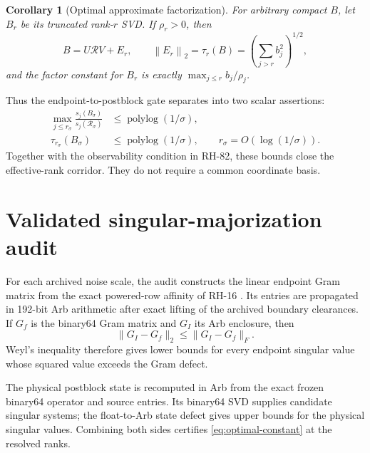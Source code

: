 \documentclass[11pt]{article}
\newtheorem{corollary}[theorem]{Corollary}
\theoremstyle{remark}
\newcommand{\norm}[1]{\left\lVert#1\right\rVert}
\newcommand{\cR}{\mathcal R}
\begin{document}
\begin{corollary}[Optimal approximate factorization]
\label{cor:approximate}
For arbitrary compact $B$, let $B_r$ be its truncated rank-$r$ SVD.  If
$\rho_r>0$, then
\begin{equation}
 B=U\cR V+E_r,
 \qquad
 \norm{E_r}_2=\tau_r(B)
 =\left(\sum_{j>r}b_j^2\right)^{1/2},
 \label{eq:approximate}
\end{equation}
and the factor constant for $B_r$ is exactly
$\max_{j\le r}b_j/\rho_j$.
\end{corollary}

Thus the endpoint-to-postblock gate separates into two scalar assertions:
\begin{align}
 \max_{j\le r_\sigma}\frac{s_j(B_\sigma)}
 {s_j(\cR_\sigma)}&\le\operatorname{polylog}(1/\sigma),
 \label{eq:majorization}\\
 \tau_{r_\sigma}(B_\sigma)&\le\operatorname{polylog}(1/\sigma),
 \qquad r_\sigma=O(\log(1/\sigma)).
 \label{eq:remainder}
\end{align}
Together with the observability condition in RH-82, these bounds close the
effective-rank corridor.  They do not require a common coordinate basis.

\section{Validated singular-majorization audit}

For each archived noise scale, the audit constructs the linear endpoint Gram
matrix from the exact powered-row affinity of RH-16
\citep{WangEndpointRank2026}.  Its entries are propagated in 192-bit Arb
arithmetic after exact lifting of the archived boundary clearances.  If
$G_f$ is the binary64 Gram matrix and $G_I$ its Arb enclosure, then
\[
 \|G_I-G_f\|_2\le\|G_I-G_f\|_F.
\]
Weyl's inequality therefore gives lower bounds for every endpoint singular
value whose squared value exceeds the Gram defect.

The physical postblock state is recomputed in Arb from the exact frozen
binary64 operator and source entries.  Its binary64 SVD supplies candidate
singular systems; the float-to-Arb state defect gives upper bounds for the
physical singular values.  Combining both sides certifies
\eqref{eq:optimal-constant} at the resolved ranks.
\end{document}
